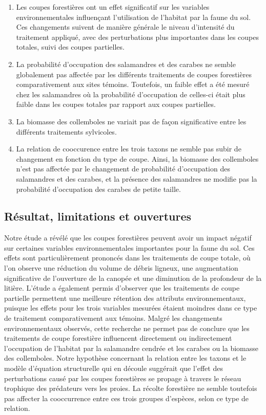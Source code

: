 \begin{enumerate}
  \item Les coupes forestières ont un effet significatif sur les variables environnementales influençant l'utilisation de l'habitat par la faune du sol. Ces changements suivent de manière générale le niveau d'intensité du traitement appliqué, avec des perturbations plus importantes dans les coupes totales, suivi des coupes partielles.
  \item La probabilité d'occupation des salamandres et des carabes ne semble globalement pas affectée par les différents traitements de coupes forestières comparativement aux sites témoins. Toutefois, un faible effet a été mesuré chez les salamandres où la probabilité d'occupation de celles-ci était plus faible dans les coupes totales par rapport aux coupes partielles.
  \item La biomasse des collemboles ne variait pas de façon significative entre les différents traitements sylvicoles.
  \item La relation de cooccurence entre les trois taxons ne semble pas subir de changement en fonction du type de coupe. Ainsi, la biomasse des collemboles n'est pas affectée par le changement de probabilité d'occupation des salamandres et des carabes, et la présence des salamandres ne modifie pas la probabilité d'occupation des carabes de petite taille.
\end{enumerate}


\subsection{Résultat, limitations et ouvertures}

Notre étude a révélé que les coupes forestières peuvent avoir un impact négatif sur certaines variables environnementales importantes pour la faune du sol. 
Ces effets sont particulièrement prononcés dans les traitements de coupe totale, où l'on observe une réduction du volume de débris ligneux, une augmentation significative de l'ouverture de la canopée et une diminution de la profondeur de la litière. 
L'étude a également permis d'observer que les traitements de coupe partielle permettent une meilleure rétention des attributs environnementaux, puisque les effets pour les trois variables mesurées étaient moindres dans ce type de traitement comparativement aux témoins.
Malgré les changements environnementaux observés, cette recherche ne permet pas de conclure que les traitements de coupe forestière influencent directement ou indirectement l'occupation de l'habitat par la salamandre cendrée et les carabes ou la biomasse des collemboles. 
Notre hypothèse concernant la relation entre les taxons et le modèle d'équation structurelle qui en découle suggérait que l'effet des perturbations causé par les coupes forestières se propage à travers le réseau trophique des prédateurs vers les proies. 
La récolte forestière ne semble toutefois pas affecter la cooccurrence entre ces trois groupes d'espèces, selon ce type de relation. 

